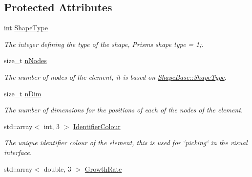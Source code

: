 \subsection*{Protected Attributes}
\begin{DoxyCompactItemize}
\item 
\hypertarget{classShapeBase_a36aedd41e8465a186a0b0c454b5b76f3}{}int \hyperlink{classShapeBase_a36aedd41e8465a186a0b0c454b5b76f3}{Shape\+Type}\label{classShapeBase_a36aedd41e8465a186a0b0c454b5b76f3}

\begin{DoxyCompactList}\small\item\em The integer defining the type of the shape, Prisms shape type = 1;. \end{DoxyCompactList}\item 
\hypertarget{classShapeBase_a0daa5629b1335ca3e1be089a006fe897}{}size\+\_\+t \hyperlink{classShapeBase_a0daa5629b1335ca3e1be089a006fe897}{n\+Nodes}\label{classShapeBase_a0daa5629b1335ca3e1be089a006fe897}

\begin{DoxyCompactList}\small\item\em The number of nodes of the element, it is based on \hyperlink{classShapeBase_a36aedd41e8465a186a0b0c454b5b76f3}{Shape\+Base\+::\+Shape\+Type}. \end{DoxyCompactList}\item 
\hypertarget{classShapeBase_a0ae4246d158f4d66b5bd1644df40f150}{}size\+\_\+t \hyperlink{classShapeBase_a0ae4246d158f4d66b5bd1644df40f150}{n\+Dim}\label{classShapeBase_a0ae4246d158f4d66b5bd1644df40f150}

\begin{DoxyCompactList}\small\item\em The number of dimensions for the positions of each of the nodes of the element. \end{DoxyCompactList}\item 
\hypertarget{classShapeBase_a8c6daae25e30af2e55599b7d1ecfbddb}{}std\+::array$<$ int, 3 $>$ \hyperlink{classShapeBase_a8c6daae25e30af2e55599b7d1ecfbddb}{Identifier\+Colour}\label{classShapeBase_a8c6daae25e30af2e55599b7d1ecfbddb}

\begin{DoxyCompactList}\small\item\em The unique identifier colour of the element, this is used for \char`\"{}picking\char`\"{} in the visual interface. \end{DoxyCompactList}\item 
\hypertarget{classShapeBase_af537b85b81aa4f0812508e7a95b8b67a}{}std\+::array$<$ double, 3 $>$ \hyperlink{classShapeBase_af537b85b81aa4f0812508e7a95b8b67a}{Growth\+Rate}\label{classShapeBase_af537b85b81aa4f0812508e7a95b8b67a}


\end{DoxyCompactItemize}
